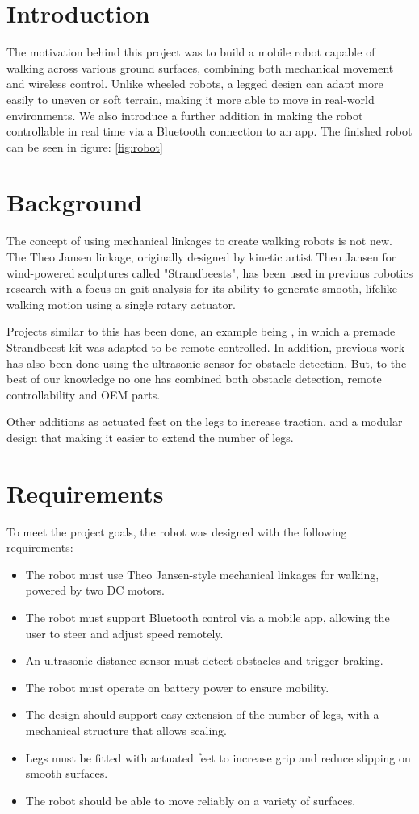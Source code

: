 \section{Introduction}
The motivation behind this project was to build a mobile robot capable of walking across various ground surfaces, combining both mechanical movement and wireless control. Unlike wheeled robots, a legged design can adapt more easily to uneven or soft terrain, making it more able to move in real-world environments. We also introduce a further addition in making the robot controllable in real time via a Bluetooth connection to an app. The finished robot can be seen in figure: \ref{fig:robot}

\section{Background}
The concept of using mechanical linkages to create walking robots is not new. The Theo Jansen linkage, originally designed by kinetic artist Theo Jansen for wind-powered sculptures called "Strandbeests", has been used in previous robotics research with a focus on gait analysis \cite{nansai2013dynamicanalysis} \cite{hernandez2016homemade} for its ability to generate smooth, lifelike walking motion using a single rotary actuator. 

Projects similar to this has been done, an example being \cite{jeremySCook}, in which a premade Strandbeest kit was adapted to be remote controlled. In addition, previous work has also been done using the ultrasonic sensor for obstacle detection. But, to the best of our knowledge no one has combined both obstacle detection, remote controllability and OEM parts. 

Other additions as actuated feet on the legs to increase traction, and a modular design that making it easier to extend the number of legs. 

\section{Requirements}
To meet the project goals, the robot was designed with the following requirements:

\begin{itemize}
    \item  The robot must use Theo Jansen-style mechanical linkages for walking, powered by two DC motors.
    \item The robot must support Bluetooth control via a mobile app, allowing the user to steer and adjust speed remotely.
    \item  An ultrasonic distance sensor must detect obstacles and trigger braking.
    \item The robot must operate on battery power to ensure mobility.
    \item The design should support easy extension of the number of legs, with a mechanical structure that allows scaling.
    \item Legs must be fitted with actuated feet to increase grip and reduce slipping on smooth surfaces.
    \item The robot should be able to move reliably on a variety of surfaces.
\end{itemize}

